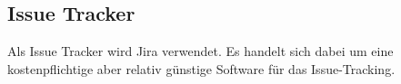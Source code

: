 \subsection{Issue Tracker}
Als Issue Tracker wird Jira verwendet. Es handelt sich dabei um eine kostenpflichtige aber relativ günstige Software für das Issue-Tracking.


